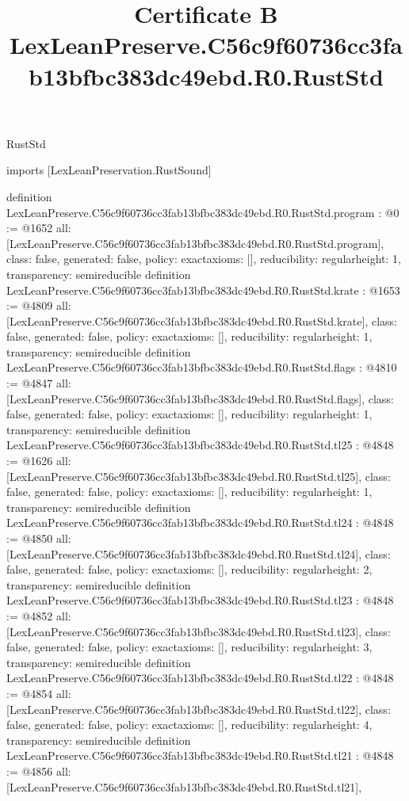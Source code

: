 \begin{lexlean}{RustStd}
\title{Certificate B LexLeanPreserve.C56c9f60736cc3fab13bfbc383dc49ebd.R0.RustStd}
\begin{coremodule}
imports [LexLeanPreservation.RustSound]

definition LexLeanPreserve.C56c9f60736cc3fab13bfbc383dc49ebd.R0.RustStd.program : @0 := @1652 {
  all: [LexLeanPreserve.C56c9f60736cc3fab13bfbc383dc49ebd.R0.RustStd.program],
  class: false,
  generated: false,
  policy: exact{axioms: []},
  reducibility: regular{height: 1},
  transparency: semireducible
}
definition LexLeanPreserve.C56c9f60736cc3fab13bfbc383dc49ebd.R0.RustStd.krate : @1653 := @4809 {
  all: [LexLeanPreserve.C56c9f60736cc3fab13bfbc383dc49ebd.R0.RustStd.krate],
  class: false,
  generated: false,
  policy: exact{axioms: []},
  reducibility: regular{height: 1},
  transparency: semireducible
}
definition LexLeanPreserve.C56c9f60736cc3fab13bfbc383dc49ebd.R0.RustStd.flags : @4810 := @4847 {
  all: [LexLeanPreserve.C56c9f60736cc3fab13bfbc383dc49ebd.R0.RustStd.flags],
  class: false,
  generated: false,
  policy: exact{axioms: []},
  reducibility: regular{height: 1},
  transparency: semireducible
}
definition LexLeanPreserve.C56c9f60736cc3fab13bfbc383dc49ebd.R0.RustStd.tl25 : @4848 := @1626 {
  all: [LexLeanPreserve.C56c9f60736cc3fab13bfbc383dc49ebd.R0.RustStd.tl25],
  class: false,
  generated: false,
  policy: exact{axioms: []},
  reducibility: regular{height: 1},
  transparency: semireducible
}
definition LexLeanPreserve.C56c9f60736cc3fab13bfbc383dc49ebd.R0.RustStd.tl24 : @4848 := @4850 {
  all: [LexLeanPreserve.C56c9f60736cc3fab13bfbc383dc49ebd.R0.RustStd.tl24],
  class: false,
  generated: false,
  policy: exact{axioms: []},
  reducibility: regular{height: 2},
  transparency: semireducible
}
definition LexLeanPreserve.C56c9f60736cc3fab13bfbc383dc49ebd.R0.RustStd.tl23 : @4848 := @4852 {
  all: [LexLeanPreserve.C56c9f60736cc3fab13bfbc383dc49ebd.R0.RustStd.tl23],
  class: false,
  generated: false,
  policy: exact{axioms: []},
  reducibility: regular{height: 3},
  transparency: semireducible
}
definition LexLeanPreserve.C56c9f60736cc3fab13bfbc383dc49ebd.R0.RustStd.tl22 : @4848 := @4854 {
  all: [LexLeanPreserve.C56c9f60736cc3fab13bfbc383dc49ebd.R0.RustStd.tl22],
  class: false,
  generated: false,
  policy: exact{axioms: []},
  reducibility: regular{height: 4},
  transparency: semireducible
}
definition LexLeanPreserve.C56c9f60736cc3fab13bfbc383dc49ebd.R0.RustStd.tl21 : @4848 := @4856 {
  all: [LexLeanPreserve.C56c9f60736cc3fab13bfbc383dc49ebd.R0.RustStd.tl21],
}
\end{coremodule}
\end{lexlean}
